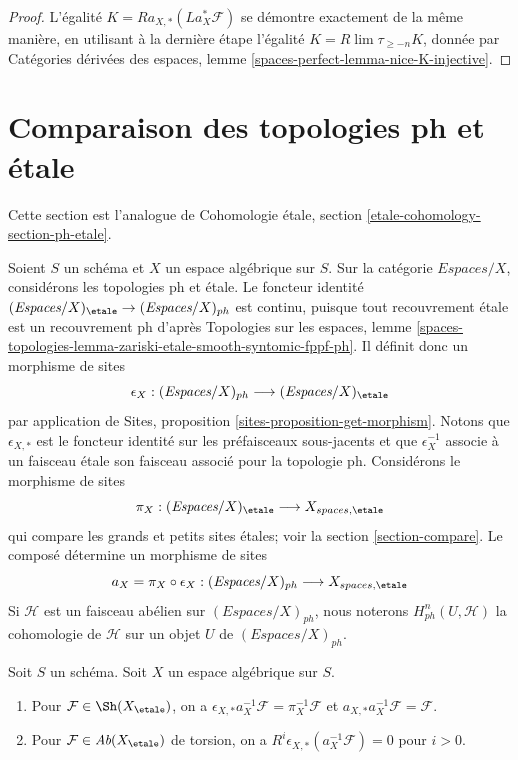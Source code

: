 \begin{proof}
\medskip\noindent
L'égalité $K = Ra_{X, *}(La_X^*\mathcal{F})$ se démontre exactement de la même
manière, en utilisant à la dernière étape l'égalité
$K = R\lim \tau_{\geq -n}K$, donnée par Catégories dérivées des espaces,
lemme \ref{spaces-perfect-lemma-nice-K-injective}.
\end{proof}








\section{Comparaison des topologies ph et étale}
\label{section-ph-etale}

\noindent
Cette section est l'analogue de Cohomologie étale, section
\ref{etale-cohomology-section-ph-etale}.

\medskip\noindent
Soient $S$ un schéma et $X$ un espace algébrique sur $S$.
Sur la catégorie $\textit{Espaces}/X$, considérons les topologies ph et étale.
Le foncteur identité
$(\textit{Espaces}/X)_\etale \to (\textit{Espaces}/X)_{ph}$
est continu, puisque tout recouvrement étale est un recouvrement ph d'après
Topologies sur les espaces, lemme
\ref{spaces-topologies-lemma-zariski-etale-smooth-syntomic-fppf-ph}.
Il définit donc un morphisme de sites
$$
\epsilon_X :
(\textit{Espaces}/X)_{ph} \longrightarrow (\textit{Espaces}/X)_\etale
$$
par application de Sites, proposition \ref{sites-proposition-get-morphism}.
Notons que $\epsilon_{X, *}$ est le foncteur identité sur les préfaisceaux
sous-jacents et que $\epsilon_X^{-1}$ associe à un faisceau étale son faisceau
associé pour la topologie ph.
Considérons le morphisme de sites
$$
\pi_X : (\textit{Espaces}/X)_\etale \longrightarrow X_{spaces, \etale}
$$
qui compare les grands et petits sites étales; voir la section \ref{section-compare}.
Le composé détermine un morphisme de sites
$$
a_X = \pi_X \circ \epsilon_X :
(\textit{Espaces}/X)_{ph}
\longrightarrow
X_{spaces, \etale}
$$
Si $\mathcal{H}$ est un faisceau abélien sur $(\textit{Espaces}/X)_{ph}$,
nous noterons $H^n_{ph}(U, \mathcal{H})$ la cohomologie de
$\mathcal{H}$ sur un objet $U$ de $(\textit{Espaces}/X)_{ph}$.

\begin{lemma}
\label{lemma-comparison-ph-etale}
Soit $S$ un schéma. Soit $X$ un espace algébrique sur $S$.
\begin{enumerate}
\item Pour $\mathcal{F} \in \Sh(X_\etale)$, on a
$\epsilon_{X, *}a_X^{-1}\mathcal{F} = \pi_X^{-1}\mathcal{F}$
et $a_{X, *}a_X^{-1}\mathcal{F} = \mathcal{F}$.
\item Pour $\mathcal{F} \in \textit{Ab}(X_\etale)$ de torsion, on a
$R^i\epsilon_{X, *}(a_X^{-1}\mathcal{F}) = 0$ pour $i > 0$.
\end{enumerate}
\end{lemma}

